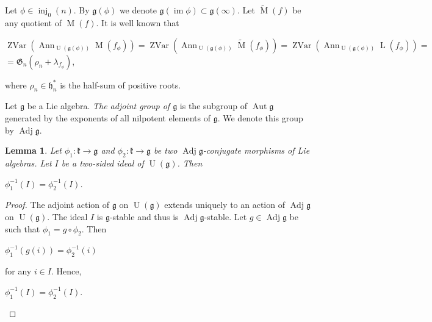 \documentclass{emsprocart}
\newtheorem{lemma}[theorem]{Lemma}
\begin{document}
Let $\phi\in\operatorname{inj}_0(n)$. By $\mathfrak g(\phi)$ we denote $\mathfrak g(\operatorname{im}\phi)\subset\mathfrak g(\infty)$. Let 
$\widetilde{\operatorname{M}}(f)$ be any quotient of $\operatorname{M}(f)$. It is well known
that\begin{center}$\operatorname{ZVar}(\operatorname{Ann}_{\operatorname{U}(\mathfrak g(\phi))}
\operatorname{M}(f_\phi))=\operatorname{ZVar}(\operatorname{Ann}_{\operatorname{U}(\mathfrak g(\phi))}\widetilde{\operatorname{M}}(f_\phi))=\operatorname{ZVar}(\operatorname{Ann}_{\operatorname{U}(\mathfrak g(\phi))}\operatorname{L}(f_\phi))=$\\$=\mathfrak
G_n(\rho_n+\lambda_{f_\phi})$,\end{center} where $\rho_n\in\mathfrak
h_n^*$ is the half-sum of positive roots.

Let $\mathfrak g$ be a Lie algebra. {\it The adjoint group of $\mathfrak g$} is the subgroup of $\operatorname{Aut}\mathfrak g$ generated by the exponents of all nilpotent elements of $\mathfrak g$. We denote this group by $\operatorname{Adj}\mathfrak g$.

\begin{lemma}\label{Lconj}Let $\phi_1: \mathfrak k\to\mathfrak g$ and $\phi_2: \mathfrak k\to\mathfrak g$ be two $\operatorname{Adj}\mathfrak g$-conjugate morphisms of Lie
algebras. Let $I$ be a two-sided ideal of $\operatorname{U}(\mathfrak g)$. Then
\begin{center}$\phi_1^{-1}(I)=\phi_2^{-1}(I)$.\end{center}\end{lemma}
\begin{proof}The adjoint action of $\mathfrak g$ on $\operatorname{U}(\mathfrak g)$ extends
uniquely to an action of $\operatorname{Adj}\mathfrak g$ on $\operatorname{U}(\mathfrak g)$. The ideal
$I$ is $\mathfrak g$-stable and thus is $\operatorname{Adj}\mathfrak g$-stable. Let $g\in
\operatorname{Adj}\mathfrak g$ be such that $\phi_1=g\circ\phi_2$.
Then\begin{center}$\phi_1^{-1}(g(i))=\phi_2^{-1}(i)$\end{center}for any $i\in I$. Hence,
\begin{center}$\phi_1^{-1}(I)=\phi_2^{-1}(I)$.\end{center}\end{proof}
\end{document}
